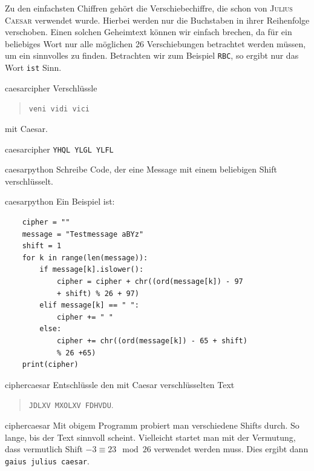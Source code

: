 \documentclass[%
<<<<<<< Updated upstream
11pt,%
twoside,%
titlepage,%
german,%
headsepline%
]{scrartcl}
\begin{document}
Zu den einfachsten Chiffren gehört die Verschiebechiffre, die schon von \textsc{Julius Caesar} verwendet wurde. Hierbei werden nur die Buchstaben in ihrer Reihenfolge verschoben. Einen solchen Geheimtext können wir einfach brechen, da für ein beliebiges Wort nur alle möglichen 26
Verschiebungen betrachtet werden müssen, um ein sinnvolles zu finden. Betrachten wir zum Beispiel \texttt{RBC}, so ergibt nur das Wort \texttt{ist} Sinn.

\begin{uebenv}{caesarcipher}
    Verschlüssle 
    \begin{quote}
        \texttt{veni vidi vici}    
    \end{quote}
    mit Caesar.
\end{uebenv}

\begin{lsg}{caesarcipher}
    \texttt{YHQL YLGL YLFL}
\end{lsg}

\begin{uebenv}{caesarpython}
    Schreibe Code, der eine Message mit einem beliebigen Shift verschlüsselt.
\end{uebenv}

\begin{lsg}{caesarpython}
Ein Beispiel ist:
 
\begin{lstlisting}
    cipher = ""
    message = "Testmessage aBYz"
    shift = 1
    for k in range(len(message)):
        if message[k].islower():
            cipher = cipher + chr((ord(message[k]) - 97
            + shift) % 26 + 97)
        elif message[k] == " ":
            cipher += " "
        else:
            cipher += chr((ord(message[k]) - 65 + shift)
            % 26 +65)
    print(cipher)
\end{lstlisting}
\end{lsg}

\begin{uebenv}{ciphercaesar}
    Entschlüssle den mit Caesar verschlüsselten Text
    \begin{quote}
        \texttt{JDLXV MXOLXV FDHVDU}.
    \end{quote}
\end{uebenv}

\begin{lsg}{ciphercaesar}
    Mit obigem Programm probiert man verschiedene Shifts durch. So lange, bis der Text sinnvoll scheint. Vielleicht startet man mit der Vermutung, dass vermutlich Shift $-3\equiv23\mod26$ verwendet werden muss. Dies ergibt dann \texttt{gaius julius caesar}.
\end{lsg}
\end{document}

